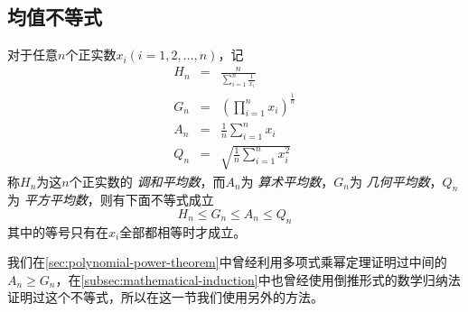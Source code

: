 \subsection{均值不等式}

\begin{theorem}[均值不等式]
  对于任意$n$个正实数$x_{i}(i=1,2,\ldots,n)$，记
  \begin{eqnarray}
    \label{eq:definition-of-average}
    H_n &=& \frac{n}{\sum_{i=1}^n \frac{1}{x_i}} \\
    G_n &=& (\prod_{i=1}^nx_{i})^{\frac{1}{n}} \\
    A_n &=& \frac{1}{n}\sum_{i=1}^{n}x_i \\
    Q_n &=& \sqrt{\frac{1}{n}\sum_{i=1}^nx_i^2}
  \end{eqnarray}
  称$H_{n}$为这$n$个正实数的 \emph{调和平均数}，而$A_{n}$为 \emph{算术平均数}，$G_n$为 \emph{几何平均数}，$Q_{n}$为 \emph{平方平均数}，则有下面不等式成立
  \begin{equation}
    \label{eq:mean-inequation-general}
    H_{n} \leqslant G_{n} \leqslant A_{n} \leqslant Q_{n}
  \end{equation}
  其中的等号只有在$x_{i}$全部都相等时才成立。
\end{theorem}

我们在\autoref{sec:polynomial-power-theorem}中曾经利用多项式乘幂定理证明过中间的$A_n \geqslant G_n$，在\autoref{subsec:mathematical-induction}中也曾经使用倒推形式的数学归纳法证明过这个不等式，所以在这一节我们使用另外的方法。

